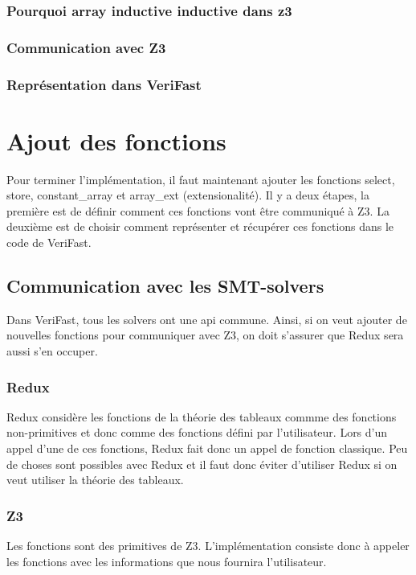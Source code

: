 \documentclass[9pt]{book}
\newcommand{\verifast}{VeriFast}
\begin{document}
			\subsubsection{Pourquoi array inductive inductive dans z3}
			\subsubsection{Communication avec Z3}
			\subsubsection{Repr\'esentation dans \verifast{}}
	\section{Ajout des fonctions}
	Pour terminer l'impl\'ementation, il faut maintenant ajouter les fonctions select, store, constant\_array et array\_ext (extensionalit\'e). Il y a deux \'etapes, la premi\`ere est de d\'efinir comment ces fonctions vont \^etre communiqu\'e \`a Z3. La deuxi\`eme est de choisir comment repr\'esenter  et r\'ecup\'erer ces fonctions dans le code de \verifast{}.
		\subsection{Communication avec les SMT-solvers}
		Dans \verifast{}, tous les solvers ont une api commune. Ainsi, si on veut ajouter de nouvelles fonctions pour communiquer avec Z3, on doit s'assurer que Redux sera aussi s'en occuper.
			\subsubsection{Redux}
			Redux consid\`ere les fonctions de la th\'eorie des tableaux commme des fonctions non-primitives et donc comme des fonctions d\'efini par l'utilisateur. Lors d'un appel d'une de ces fonctions, Redux fait donc un appel de fonction classique. Peu de choses sont possibles avec Redux et il faut donc \'eviter d'utiliser Redux si on veut utiliser la th\'eorie des tableaux.
			\subsubsection{Z3}
			Les fonctions sont des primitives de Z3. L'impl\'ementation consiste donc \`a appeler les fonctions avec les informations que nous fournira l'utilisateur.
\end{document}

